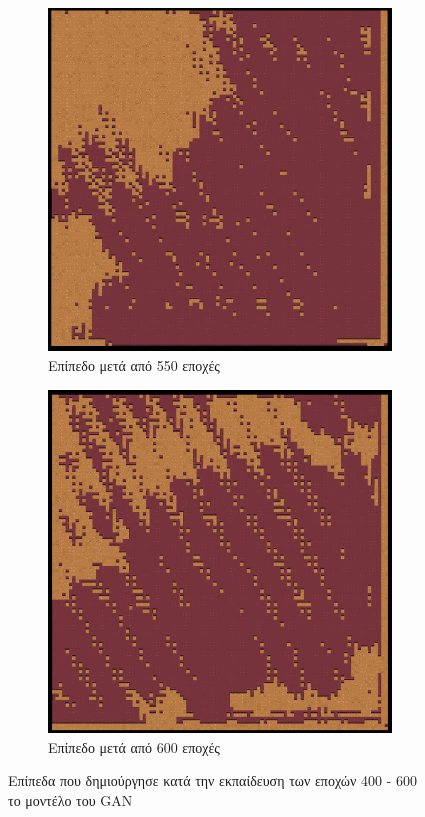 \begin{figure}[H]
\begin{subfigure}{.5\textwidth}
  \centering
  \includegraphics[width=.8\linewidth]{../images/generated/550.png}
  \caption{Επίπεδο μετά από 550 εποχές}
  \label{fig:sfig2}
\end{subfigure}
\begin{subfigure}{.5\textwidth}
  \centering
  \includegraphics[width=.8\linewidth]{../images/generated/600.png}
  \caption{Επίπεδο μετά από 600 εποχές}
  \label{fig:sfig2}
\end{subfigure}
\caption{Επίπεδα που δημιούργησε κατά την εκπαίδευση των εποχών 400 - 600 το μοντέλο του GAN}
\label{fig:fig}
\end{figure}

